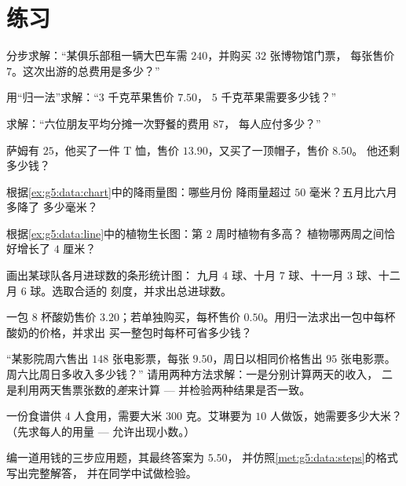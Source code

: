 \section{练习}

\begin{exercise}[$\star$]\label{exo:g5:data:1}
分步求解：“某俱乐部租一辆大巴车需 $240$，并购买 $32$ 张博物馆门票，
每张售价 $7$。这次出游的总费用是多少？”
\end{exercise}

\begin{exercise}[$\star$]\label{exo:g5:data:2}
用“归一法”求解：“$3$ 千克苹果售价 $7.50$，
$5$ 千克苹果需要多少钱？”
\end{exercise}

\begin{exercise}[$\star$]\label{exo:g5:data:3}
求解：“六位朋友平均分摊一次野餐的费用 $87$，
每人应付多少？”
\end{exercise}

\begin{exercise}[$\star$]\label{exo:g5:data:4}
萨姆有 $25$，他买了一件 T 恤，售价 $13.90$，又买了一顶帽子，售价 $8.50$。
他还剩多少钱？
\end{exercise}

\begin{exercise}[$\star$]\label{exo:g5:data:5}
根据\cref{ex:g5:data:chart}中的降雨量图：哪些月份
降雨量超过 $50$ 毫米？五月比六月多降了
多少毫米？
\end{exercise}

\begin{exercise}[$\star$]\label{exo:g5:data:6}
根据\cref{ex:g5:data:line}中的植物生长图：第 $2$ 周时植物有多高？
植物哪两周之间恰好增长了
$4$ 厘米？
\end{exercise}

\begin{exercise}[$\star$]\label{exo:g5:data:7}
画出某球队各月进球数的条形统计图：
九月 $4$ 球、十月 $7$ 球、十一月 $3$ 球、十二月 $6$ 球。选取合适的
刻度，并求出总进球数。
\end{exercise}

\begin{exercise}[$\star$]\label{exo:g5:data:8}
一包 $8$ 杯酸奶售价 $3.20$；若单独购买，每杯售价
$0.50$。用归一法求出一包中每杯酸奶的价格，并求出
买一整包时每杯可省多少钱？
\end{exercise}

\begin{exercise}[$\star\star$]\label{exo:g5:data:9}
“某影院周六售出 $148$ 张电影票，每张 $9.50$，周日以相同价格售出 $95$ 张电影票。
周六比周日多收入多少钱？”
请用两种方法求解：一是分别计算两天的收入，
二是利用两天售票张数的\emph{差}来计算 ---
并检验两种结果是否一致。
\end{exercise}

\begin{exercise}[$\star\star$]\label{exo:g5:data:10}
一份食谱供 $4$ 人食用，需要大米 $300$ 克。艾琳要为
$10$ 人做饭，她需要多少大米？（先求每人的用量 ---
允许出现小数。）
\end{exercise}

\begin{exercise}[$\star\star$]\label{exo:g5:data:11}
编一道用钱的三步应用题，其最终答案为 $5.50$，
并仿照\cref{met:g5:data:steps}的格式写出完整解答，
并在同学中试做检验。
\end{exercise}
